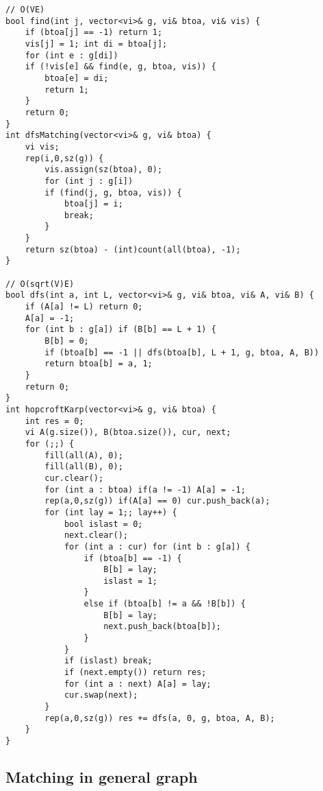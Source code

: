 \documentclass[a4paper,9pt]{article}
\begin{document}
\begin{lstlisting}
// O(VE)
bool find(int j, vector<vi>& g, vi& btoa, vi& vis) {
	if (btoa[j] == -1) return 1;
	vis[j] = 1; int di = btoa[j];
	for (int e : g[di])
	if (!vis[e] && find(e, g, btoa, vis)) {
		btoa[e] = di;
		return 1;
	}
	return 0;
}
int dfsMatching(vector<vi>& g, vi& btoa) {
	vi vis;
	rep(i,0,sz(g)) {
		vis.assign(sz(btoa), 0);
		for (int j : g[i])
		if (find(j, g, btoa, vis)) {
			btoa[j] = i;
			break;
		}
	}
	return sz(btoa) - (int)count(all(btoa), -1);
}

// O(sqrt(V)E)
bool dfs(int a, int L, vector<vi>& g, vi& btoa, vi& A, vi& B) {
	if (A[a] != L) return 0;
	A[a] = -1;
	for (int b : g[a]) if (B[b] == L + 1) {
		B[b] = 0;
		if (btoa[b] == -1 || dfs(btoa[b], L + 1, g, btoa, A, B))
		return btoa[b] = a, 1;
	}
	return 0;
}
int hopcroftKarp(vector<vi>& g, vi& btoa) {
	int res = 0;
	vi A(g.size()), B(btoa.size()), cur, next;
	for (;;) {
		fill(all(A), 0);
		fill(all(B), 0);
		cur.clear();
		for (int a : btoa) if(a != -1) A[a] = -1;
		rep(a,0,sz(g)) if(A[a] == 0) cur.push_back(a);
		for (int lay = 1;; lay++) {
			bool islast = 0;
			next.clear();
			for (int a : cur) for (int b : g[a]) {
				if (btoa[b] == -1) {
					B[b] = lay;
					islast = 1;
				}
				else if (btoa[b] != a && !B[b]) {
					B[b] = lay;
					next.push_back(btoa[b]);
				}
			}
			if (islast) break;
			if (next.empty()) return res;
			for (int a : next) A[a] = lay;
			cur.swap(next);
		}
		rep(a,0,sz(g)) res += dfs(a, 0, g, btoa, A, B);
	}
}
\end{lstlisting}

\subsection{Matching in general graph}
\end{document}
